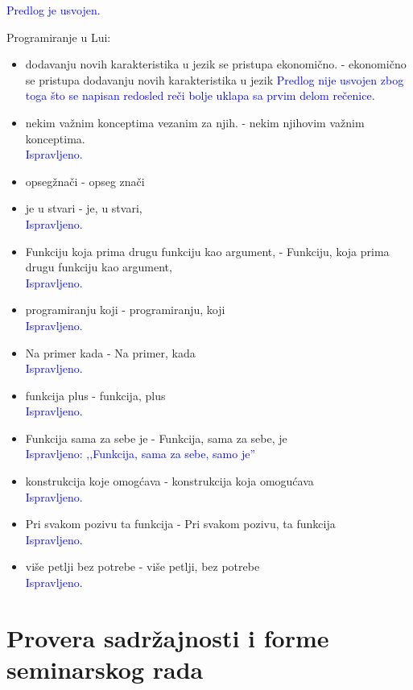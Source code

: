 \documentclass[a4paper]{report}
\newcommand{\odgovorAutora}[1]{\textcolor{blue}{#1}}
\begin{document}
{\begin{itemize}
  \odgovorAutora{Predlog je usvojen.}
\end{itemize}
Programiranje u Lui: 
\begin{itemize}
  \item dodavanju novih karakteristika u jezik se pristupa ekonomično. - ekonomično se pristupa dodavanju novih karakteristika u jezik
  \odgovorAutora{Predlog nije usvojen zbog toga što se napisan redosled reči bolje uklapa sa prvim delom rečenice.}
  \item nekim važnim konceptima vezanim za njih.  - nekim njihovim važnim konceptima.\\
  \odgovorAutora{Ispravljeno.}
  \item opsegžnači -  opseg znači
  \item  je u stvari - je, u stvari,\\
  \odgovorAutora{Ispravljeno.}
  \item  Funkciju koja prima drugu funkciju kao argument, - Funkciju, koja prima drugu funkciju kao argument,\\
  \odgovorAutora{Ispravljeno.}
  \item programiranju koji - programiranju, koji\\
  \odgovorAutora{Ispravljeno.}
  \item  Na primer kada -  Na primer, kada\\
  \odgovorAutora{Ispravljeno.}
  \item   funkcija plus -  funkcija, plus\\
  \odgovorAutora{Ispravljeno.}
  \item  Funkcija sama za sebe je - Funkcija, sama za sebe, je \\
  \odgovorAutora{Ispravljeno: ,,Funkcija, sama za sebe, samo je''}     
  \item  konstrukcija koje omogćava - konstrukcija koja omogućava\\
  \odgovorAutora{Ispravljeno.}
  \item   Pri svakom pozivu ta funkcija  -  Pri svakom pozivu, ta funkcija\\
  \odgovorAutora{Ispravljeno.}
  \item  više petlji bez potrebe - više petlji, bez potrebe\\
  \odgovorAutora{Ispravljeno.}
\end{itemize}
}

\section{Provera sadržajnosti i forme seminarskog rada}
\end{document}
